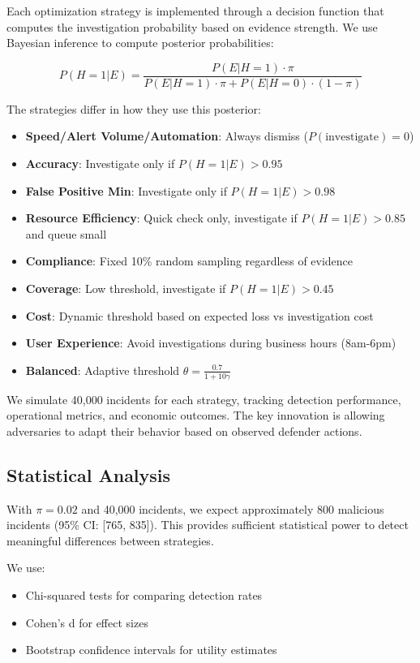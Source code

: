 \documentclass[10pt,conference]{IEEEtran}
\begin{document}
Each optimization strategy is implemented through a decision function that computes the investigation probability based on evidence strength. We use Bayesian inference to compute posterior probabilities:

$$P(H=1|E) = \frac{P(E|H=1) \cdot \pi}{P(E|H=1) \cdot \pi + P(E|H=0) \cdot (1-\pi)}$$

The strategies differ in how they use this posterior:

\begin{itemize}
\item \textbf{Speed/Alert Volume/Automation}: Always dismiss ($P(\text{investigate}) = 0$)
\item \textbf{Accuracy}: Investigate only if $P(H=1|E) > 0.95$
\item \textbf{False Positive Min}: Investigate only if $P(H=1|E) > 0.98$
\item \textbf{Resource Efficiency}: Quick check only, investigate if $P(H=1|E) > 0.85$ and queue small
\item \textbf{Compliance}: Fixed 10\% random sampling regardless of evidence
\item \textbf{Coverage}: Low threshold, investigate if $P(H=1|E) > 0.45$
\item \textbf{Cost}: Dynamic threshold based on expected loss vs investigation cost
\item \textbf{User Experience}: Avoid investigations during business hours (8am-6pm)
\item \textbf{Balanced}: Adaptive threshold $\theta = \frac{0.7}{1 + 10\gamma}$
\end{itemize}

We simulate 40,000 incidents for each strategy, tracking detection performance, operational metrics, and economic outcomes. The key innovation is allowing adversaries to adapt their behavior based on observed defender actions.

\subsection{Statistical Analysis}

With $\pi = 0.02$ and 40,000 incidents, we expect approximately 800 malicious incidents (95\% CI: [765, 835]). This provides sufficient statistical power to detect meaningful differences between strategies.

We use:
\begin{itemize}
\item Chi-squared tests for comparing detection rates
\item Cohen's d for effect sizes
\item Bootstrap confidence intervals for utility estimates
\end{itemize}
\end{document}
